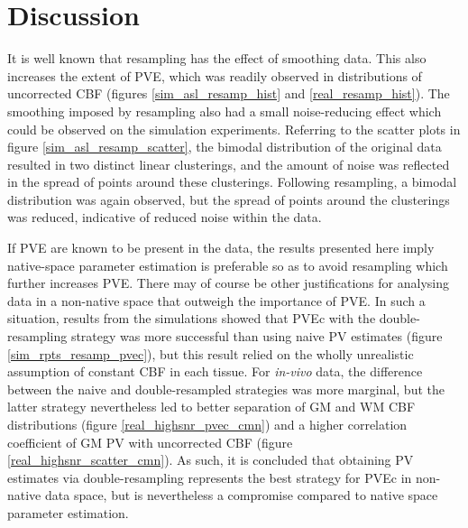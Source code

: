 \section{Discussion}

It is well known that resampling has the effect of smoothing data. This also increases the extent of PVE, which was readily observed in distributions of uncorrected CBF (figures \ref{sim_asl_resamp_hist} and \ref{real_resamp_hist}). The smoothing imposed by resampling also had a small noise-reducing effect which could be observed on the simulation experiments. Referring to the scatter plots in figure \ref{sim_asl_resamp_scatter}, the bimodal distribution of the original data resulted in two distinct linear clusterings, and the amount of noise was reflected in the spread of points around these clusterings. Following resampling, a bimodal distribution was again observed, but the spread of points around the clusterings was reduced, indicative of reduced noise within the data. 

If PVE are known to be present in the data, the results presented here imply native-space parameter estimation is preferable so as to avoid resampling which further increases PVE. There may of course be other justifications for analysing data in a non-native space that outweigh the importance of PVE. In such a situation, results from the simulations showed that PVEc with the double-resampling strategy was more successful than using naive PV estimates (figure \ref{sim_rpts_resamp_pvec}), but this result relied on the wholly unrealistic assumption of constant CBF in each tissue. For \textit{in-vivo} data, the difference between the naive and double-resampled strategies was more marginal, but the latter strategy nevertheless led to better separation of GM and WM CBF distributions (figure \ref{real_highsnr_pvec_cmn}) and a higher correlation coefficient of GM PV with uncorrected CBF (figure \ref{real_highsnr_scatter_cmn}). As such, it is concluded that obtaining PV estimates via double-resampling represents the best strategy for PVEc in non-native data space, but is nevertheless a compromise compared to native space parameter estimation. 

